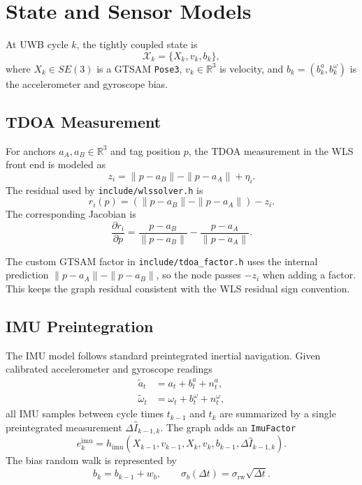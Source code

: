 \documentclass[11pt,a4paper]{article}
\begin{document}
\section{State and Sensor Models}

At UWB cycle \(k\), the tightly coupled state is
\begin{equation}
  \mathcal{X}_k = \{X_k, v_k, b_k\},
\end{equation}
where \(X_k \in SE(3)\) is a GTSAM \texttt{Pose3}, \(v_k \in \mathbb{R}^3\) is velocity, and \(b_k = (b^a_k,b^\omega_k)\) is the accelerometer and gyroscope bias.

\subsection{TDOA Measurement}

For anchors \(a_A,a_B \in \mathbb{R}^3\) and tag position \(p\), the TDOA measurement in the WLS front end is modeled as
\begin{equation}
  z_i = \|p-a_B\| - \|p-a_A\| + \eta_i.
\end{equation}
The residual used by \texttt{include/wlssolver.h} is
\begin{equation}
  r_i(p) = \left(\|p-a_B\| - \|p-a_A\|\right) - z_i.
\end{equation}
The corresponding Jacobian is
\begin{equation}
  \frac{\partial r_i}{\partial p}
  =
  \frac{p-a_B}{\|p-a_B\|}
  -
  \frac{p-a_A}{\|p-a_A\|}.
\end{equation}

The custom GTSAM factor in \texttt{include/tdoa\_factor.h} uses the internal prediction \(\|p-a_A\|-\|p-a_B\|\), so the node passes \(-z_i\) when adding a factor. This keeps the graph residual consistent with the WLS residual sign convention.

\subsection{IMU Preintegration}

The IMU model follows standard preintegrated inertial navigation. Given calibrated accelerometer and gyroscope readings
\begin{align}
  \tilde{a}_t &= a_t + b^a_t + n^a_t, \\
  \tilde{\omega}_t &= \omega_t + b^\omega_t + n^\omega_t,
\end{align}
all IMU samples between cycle times \(t_{k-1}\) and \(t_k\) are summarized by a single preintegrated measurement \(\Delta \hat{I}_{k-1,k}\). The graph adds an \texttt{ImuFactor}
\begin{equation}
  e^{\mathrm{imu}}_k =
  h_{\mathrm{imu}}\!\left(X_{k-1},v_{k-1},X_k,v_k,b_{k-1},\Delta \hat{I}_{k-1,k}\right).
\end{equation}
The bias random walk is represented by
\begin{equation}
  b_k = b_{k-1} + w_b,\qquad
  \sigma_b(\Delta t)=\sigma_{\mathrm{rw}}\sqrt{\Delta t}.
\end{equation}
\end{document}
